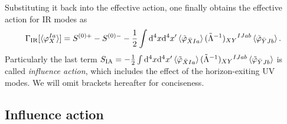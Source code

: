 \documentclass[a4paper,11pt]{article}
\newcommand{\dd}{\mathrm{d}}
\newcommand{\IR}{\text{IR}}
\newcommand{\SIA}{S_\text{IA}}
\newcommand{\bae}[1]{\begin{align} #1 \end{align}}
\begin{document}
Substituting it back into the effective action, one finally obtains the effective action for IR modes as
\bae{\label{eq: GammaIR}
	\Gamma_\IR[\braket{\varphi_X^{Ia}}]=S^{(0)+}-S^{(0)-}-\frac{1}{2}\int\dd^4x\dd^4x^\prime
	\braket{\tilde{\varphi}_{\bar{X}Ia}}(\tilde{\Lambda}^{-1})_{XY}{}^{IJab}
	\braket{\tilde{\varphi}_{\bar{Y}Jb}}.
}
Particularly the last term $\SIA=-\frac{1}{2}\int\dd^4x\dd^4x^\prime
\braket{\tilde{\varphi}_{\bar{X}Ia}}(\tilde{\Lambda}^{-1})_{XY}{}^{IJab}\braket{\tilde{\varphi}_{\bar{Y}Jb}}$
is called \emph{influence action}, which includes the effect of the horizon-exiting UV modes.
We will omit brackets hereafter for conciseness.





\subsection{Influence action}\label{sec: influence action}
\end{document}
